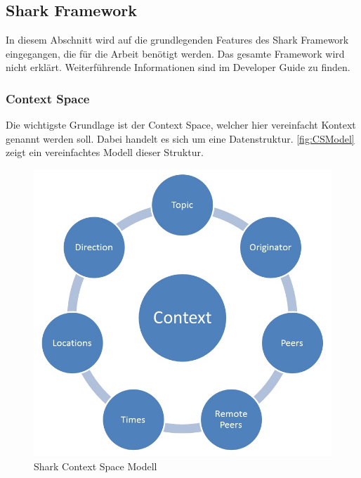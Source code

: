 \documentclass[a4paper]{article}
\begin{document}
	\subsection{Shark Framework}
	
	In diesem Abschnitt wird auf die grundlegenden Features des Shark
	Framework \cite{SharkFW} eingegangen, die für die Arbeit benötigt werden. 	
	Das gesamte	Framework wird nicht erklärt. Weiterführende Informationen sind
	im Developer Guide \cite{SharkManual} zu finden.
	
	\subsubsection{Context Space} 
	\label{sec:CS}
	
	Die wichtigste Grundlage ist der Context Space, welcher hier vereinfacht Kontext
	genannt werden soll. Dabei handelt es sich um eine Datenstruktur.
	\autoref{fig:CSModel} zeigt ein vereinfachtes Modell dieser Struktur.
	
	\begin{figure}[H] 
		\includegraphics[width=\linewidth]{../Bilder/contextspace.jpg}
		\caption{Shark Context Space Modell}
		\label{fig:CSModel}
	\end{figure}
	
\end{document}
